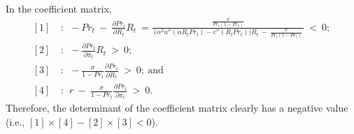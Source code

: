 In the coefficient matrix,
\begin{equation*}
\begin{split}
    [1] \ 
    & : \ \ -Pr_{t} \ - \ \frac{\partial Pr_{t}}{\partial R_{t}} R_{t} \ = \frac{\frac{\sigma}{Pr_{t}(1 - Pr_{t})}}{ \ \big( \alpha^{2} u''(\alpha R_{t} Pr_{t}) - c''(R_{t} Pr_{t}) \big) R_{t} \ - \ \frac{\sigma}{Pr_{t}(1 - Pr_{t})} \ } \ < \ 0; \\
    [2] \
    & : \ \ -\frac{\partial Pr_{t}}{\partial \pi_{t}} R_{t} \ > \ 0; \\
    [3] \
    & : \ \ -\frac{\sigma}{1 - Pr_{t}} \frac{\partial Pr_{t}}{\partial R_{t}} \ > \ 0; \ \text{and} \\
    [4] \ 
    & : \ \ r \ - \ \frac{\sigma}{1 - Pr_{t}} \frac{\partial Pr_{t}}{\partial \pi_{t}} \ > \ 0.
\end{split}
\end{equation*}
Therefore, the determinant of the coefficient matrix clearly has a negative value (i.e., $[1] \times [4] - [2] \times [3] < 0$). 